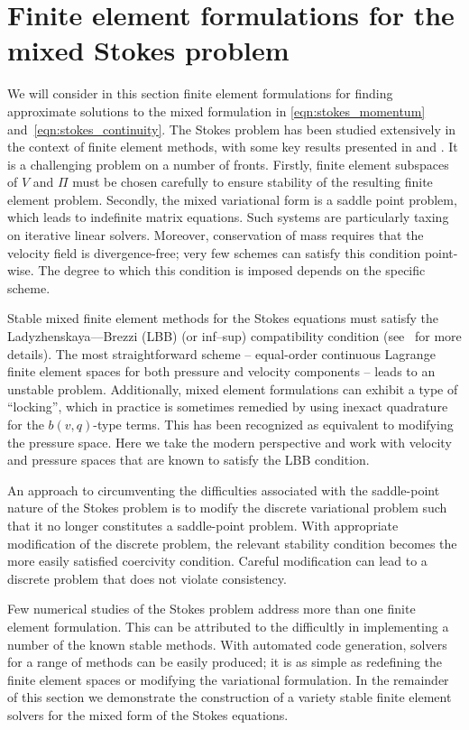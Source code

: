 \section{Finite element formulations for the mixed Stokes problem}

We will consider in this section finite element formulations
for finding approximate solutions to the mixed formulation in
\eqref{eqn:stokes_momentum} and~\eqref{eqn:stokes_continuity}.  The Stokes
problem has been studied extensively in the context of finite element
methods, with some key results presented in \citet{BrezziFortin1991}
and \citet{BrennerScott2008}.  It is a challenging problem on a number
of fronts.  Firstly, finite element subspaces of $V$ and $\Pi$ must be
chosen carefully to ensure stability of the resulting finite element
problem. Secondly, the mixed variational form is a saddle point problem,
which leads to indefinite matrix equations. Such systems are particularly
taxing on iterative linear solvers.  Moreover, conservation of mass requires
that the velocity field is divergence-free; very few schemes can satisfy
this condition point-wise.  The degree to which this condition is imposed
depends on the specific scheme.

Stable mixed finite element methods for the Stokes equations must satisfy
the Ladyzhenskaya--\babuska--Brezzi (LBB) (or inf--sup) compatibility
condition (see~\citet{BrezziFortin1991} for more details).  The most
straightforward scheme -- equal-order continuous Lagrange finite element
spaces for both pressure and velocity components -- leads to an unstable
problem.  Additionally, mixed element formulations can exhibit a type of
``locking'', which in practice is sometimes remedied by using inexact
quadrature for the $b(v, q)$-type terms.  This has been recognized as
equivalent to modifying the pressure space.  Here we take the modern
perspective and work with velocity and pressure spaces that are known
to satisfy the LBB condition.

An approach to circumventing the difficulties associated with the
saddle-point nature of the Stokes problem is to modify the discrete
variational problem such that it no longer constitutes a saddle-point
problem. With appropriate modification of the discrete problem, the
relevant stability condition becomes the more easily satisfied coercivity
condition. Careful modification can lead to a discrete problem that does
not violate consistency.

Few numerical studies of the Stokes problem address more than one
finite element formulation. This can be attributed to the difficultly
in implementing a number of the known stable methods. With automated
code generation, solvers for a range of methods can be easily produced;
it is as simple as redefining the finite element spaces or modifying the
variational formulation.  In the remainder of this section we demonstrate
the construction of a variety stable finite element solvers for the
mixed form of the Stokes equations.

